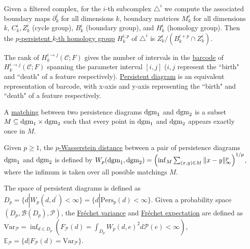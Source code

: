 \documentclass[9pt,conference]{IEEEtran}
\begin{document}
\begin{defn}
Given a filtered complex, for the $i$-th subcomplex $\triangle^i$ we compute the associated boundary maps $\partial_k^i$ for all dimensions $k$, boundary matrices $M_k^i$ for all dimensions $k$, $C_k^i, Z_k^i$ (cycle group), $B_k^i$ (boundary group), and $H_k^i$ (homology group). Then the \underline{$p$-persistent $k$-th homology group} $H_k^{i,p}$ of $\triangle^i$ is $Z_k^i / (B_k^{i+p}\cap Z_k^i)$.
\end{defn}

\begin{thm}
The rank of $H_k^{i\to j}(\mathscr{C}; F)$ gives the number of intervals in the \underline{barcode} of $H_k^{i\to j}(\mathscr{C}; F)$ spanning the parameter interval $[i,j]$ ($i, j$ represent the ``birth" and ``death" of a feature respectively). \underline{Persistent diagram} is an equivalent representation of barcode, with x-axis and y-axis representing the ``birth" and ``death" of a feature respectively.
\end{thm}

\begin{defn}
A \underline{matching} between two persistence diagrams $\text{dgm}_1$ and $\text{dgm}_2$ is a subset $M\subseteq \text{dgm}_1 \times \text{dgm}_2$ such that every point in $\text{dgm}_1 $ and $\text{dgm}_2$ appears exactly once in $M$. 

Given $p\ge 1$, the \underline{$p$-Wasserstein distance} between a pair of persistence diagrams $\text{dgm}_1$ and $\text{dgm}_2$ is defined by $W_p(\text{dgm}_1, \text{dgm}_2) = \left(\inf_M \sum_{(x,y)\in M}\|x-y\|^p_\infty\right)^{1/p}$, where the infimum is taken over all possible matchings $M$.
\end{defn}
\begin{defn}
The space of persistent diagrams is defined as $D_p = \{d | W_p(d,d^\prime)<\infty\} = \{d | \text{Pers}_p(d)<\infty\}$. Given a probability space $(D_p, \mathcal{B}(D_p), \mathcal{P})$, the \underline{Fr\'echet variance} and \underline{Fr\'echet expectation} are defined as 
$\text{Var}_\mathcal{P}= \inf_{d\in D_p}\left(F_\mathcal{P}(d) = \int_{D_p} W_p(d,e)^2  d \mathcal{P}(e)<\infty\right)$, $\mathbb{E}_\mathcal{P} = \{d | F_{\mathcal{P}}(d) =\text{Var}_\mathcal{P} \}.$
\end{defn}
\end{document}
